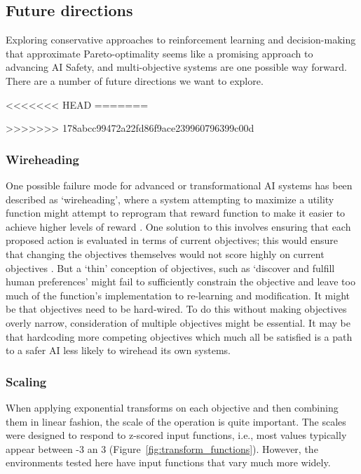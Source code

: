 \subsection{Future directions}

Exploring conservative approaches to reinforcement learning and decision-making that approximate Pareto-optimality seems like a promising approach to advancing AI Safety, and multi-objective systems are one possible way forward. There are a number of future directions we want to explore.

<<<<<<< HEAD
=======

>>>>>>> 178abcc99472a22fd86f9ace239960796399c00d
\subsubsection{Wireheading}

One possible failure mode for advanced or transformational AI systems has been described as `wireheading', where a system attempting to maximize a utility function might attempt to reprogram that reward function to make it easier to achieve higher levels of reward \cite{demski_a_stable_2017}. One solution to this involves ensuring that each proposed action is evaluated in terms of current objectives; this would ensure that changing the objectives themselves would not score highly on current objectives \cite{dewey_learning_2011}. But a `thin' conception of objectives, such as `discover and fulfill human preferences' might fail to sufficiently constrain the objective and leave too much of the function's implementation to re-learning and modification. It might be that objectives need to be hard-wired. To do this without making objectives overly narrow, consideration of multiple objectives might be essential. It may be that hardcoding more competing objectives which much all be satisfied is a path to a safer AI less likely to wirehead its own systems.

\subsubsection{Scaling}

When applying exponential transforms  on each objective and then combining them in linear fashion, the scale of the operation is quite important. The scales were designed to respond to z-scored input functions, i.e., most values typically appear between -3 an 3 (Figure~\ref{fig:transform_functions}). However, the environments tested here have input functions that vary much more widely.

